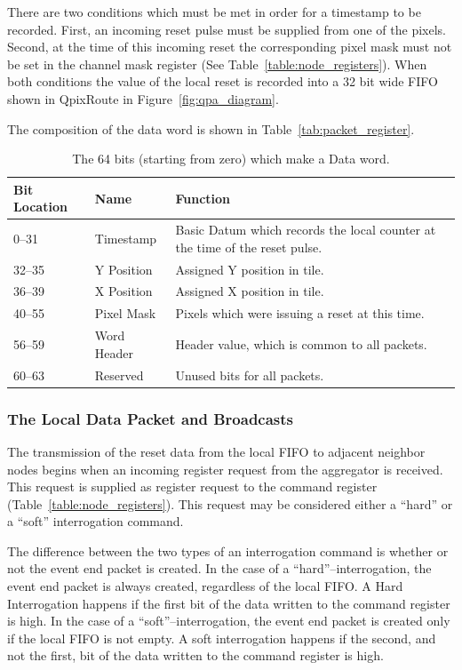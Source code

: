 There are two conditions which must be met in order for a timestamp to be recorded.
First, an incoming reset pulse must be supplied from one of the pixels.
Second, at the time of this incoming reset the corresponding pixel mask must not be set in the channel mask register (See Table~\ref{table:node_registers}).
When both conditions the value of the local reset is recorded into a 32 bit wide FIFO shown in QpixRoute in Figure~\ref{fig:qpa_diagram}.

The composition of the data word is shown in Table~\ref{tab:packet_register}.
\begin{table}
\begin{center}
\begin{tabular}{|| p{30mm} | p{30mm} | p{90mm} ||}
 \hline
 Bit Location & Name & Function \\ [0.5ex]
 \hline\hline
  0--31 & Timestamp & Basic Datum which records the local counter at the time of the reset pulse. \\
 \hline
  32--35 & Y Position & Assigned Y position in tile. \\
 \hline
  36--39 & X Position & Assigned X position in tile. \\
 \hline
  40--55 & Pixel Mask & Pixels which were issuing a reset at this time. \\
 \hline
  56--59 & Word Header & Header value, which is common to all packets. \\
 \hline
  60--63 & Reserved & Unused bits for all packets. \\
 \hline
\end{tabular}
\caption{The 64 bits (starting from zero) which make a Data word.}
\label{tab:packet_data}
\end{center}
\end{table}

\subsubsection{The Local Data Packet and Broadcasts}
\label{sec:local_data_packet}
The transmission of the reset data from the local FIFO to adjacent neighbor nodes begins when an incoming register request from the aggregator is received.
This request is supplied as register request to the command register (Table~\ref{table:node_registers}).
This request may be considered either a ``hard'' or a ``soft'' interrogation command.

The difference between the two types of an interrogation command is whether or not the event end packet is created.
In the case of a ``hard''--interrogation, the event end packet is always created, regardless of the local FIFO.
A Hard Interrogation happens if the first bit of the data written to the command register is high.
In the case of a ``soft''--interrogation, the event end packet is created only if the local FIFO is not empty.
A soft interrogation happens if the second, and not the first, bit of the data written to the command register is high.

